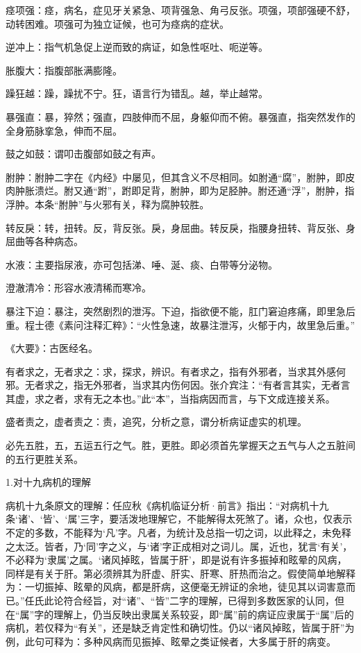 \documentclass[draft,12pt]{ctexbook}
\begin{document}
\begin{jiaozhu}
	\item 痉项强：痉，病名，症见牙关紧急、项背强急、角弓反张。项强，项部强硬不舒，动转困难。项强可为独立证候，也可为痉病的症状。
	\item 逆冲上：指气机急促上逆而致的病证，如急性呕吐、呃逆等。
	\item 胀腹大：指腹部胀满膨隆。
	\item 躁狂越：躁，躁扰不宁。狂，语言行为错乱。越，举止越常。
	\item 暴强直：暴，猝然；强直，四肢伸而不屈，身躯仰而不俯。暴强直，指突然发作的全身筋脉挛急，伸而不屈。
	\item 鼓之如鼓：谓叩击腹部如鼓之有声。
	\item 胕肿：胕肿二字在《内经》中屡见，但其含义不尽相同。如胕通“腐”，胕肿，即皮肉肿胀溃烂。胕又通“跗”，跗即足背，胕肿，即为足胫肿。胕还通“浮”，胕肿，指浮肿。本条“胕肿”与火邪有关，释为腐肿较胜。
	\item 转反戾：转，扭转。反，背反张。戾，身屈曲。转反戾，指腰身扭转、背反张、身屈曲等各种病态。
	\item 水液：主要指尿液，亦可包括涕、唾、涎、痰、白带等分泌物。
	\item 澄澈清冷：形容水液清稀而寒冷。
	\item 暴注下迫：暴注，突然剧烈的泄泻。下迫，指欲便不能，肛门窘迫疼痛，即里急后重。程士德《素问注释汇粹》：“火性急速，故暴注泄泻，火郁于内，故里急后重。”
	\item 《大要》：古医经名。
	\item 有者求之，无者求之：求，探求，辨识。有者求之，指有外邪者，当求其外感何邪。无者求之，指无外邪者，当求其内伤何因。张介宾注：“有者言其实，无者言其虚，求之者，求有无之本也。”此“本”，当指病因而言，与下文成连接关系。
	\item 盛者责之，虚者责之：责，追究，分析之意，谓分析病证虚实的机理。
	\item 必先五胜，五，五运五行之气。胜，更胜。即必须首先掌握天之五气与人之五脏间的五行更胜关系。
\end{jiaozhu}


1.对十九病机的理解

病机十九条原文的理解：任应秋《病机临证分析·前言》指出：“对病机十九条‘诸’、‘皆’、‘属’三字，要活泼地理解它，不能解得太死煞了。诸，众也，仅表示不定的多数，不能释为‘凡’字。凡者，为统计及总指一切之词，以此释之，未免释之太泛。皆者，乃‘同’字之义，与‘诸’字正成相对之词儿。属，近也，犹言‘有关’，不必释为‘隶属’之属。‘诸风掉眩，皆属于肝’，即是说有许多振掉和眩晕的风病，同样是有关于肝。第必须辨其为肝虚、肝实、肝寒、肝热而治之。假使简单地解释为：一切振掉、眩晕的风病，都是肝病，这便毫无辨证的余地，徒见其以词害意而已。”任氏此论符合经旨，对“诸”、“皆”二字的理解，已得到多数医家的认同，但在“属”字的理解上，仍当反映出隶属关系较妥，即“属”前的病证应隶属于“属”后的病机，若仅释为“有关”，还是缺乏肯定性和确切性。仍以“诸风掉眩，皆属于肝”为例，此句可释为：多种风病而见振掉、眩晕之类证候者，大多属于肝的病变。
\end{document}
